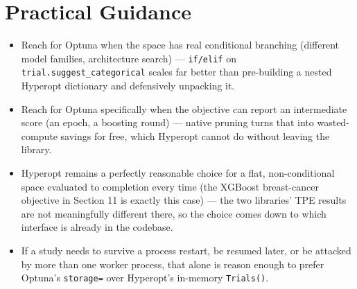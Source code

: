 \documentclass[conference]{IEEEtran}
\begin{document}
\section*{Practical Guidance}
\begin{itemize}
    \item Reach for Optuna when the space has real conditional branching (different model families, architecture search) --- \texttt{if/elif} on \texttt{trial.suggest\_categorical} scales far better than pre-building a nested Hyperopt dictionary and defensively unpacking it.
    \item Reach for Optuna specifically when the objective can report an intermediate score (an epoch, a boosting round) --- native pruning turns that into wasted-compute savings for free, which Hyperopt cannot do without leaving the library.
    \item Hyperopt remains a perfectly reasonable choice for a flat, non-conditional space evaluated to completion every time (the XGBoost breast-cancer objective in Section 11 is exactly this case) --- the two libraries' TPE results are not meaningfully different there, so the choice comes down to which interface is already in the codebase.
    \item If a study needs to survive a process restart, be resumed later, or be attacked by more than one worker process, that alone is reason enough to prefer Optuna's \texttt{storage=} over Hyperopt's in-memory \texttt{Trials()}.
\end{itemize}
\end{document}
